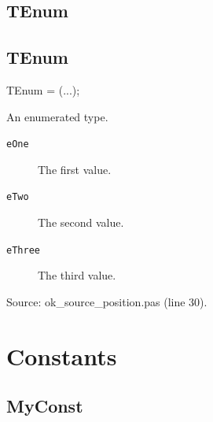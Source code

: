 \documentclass{report}
\newif\ifpdf
\begin{document}
\subsection*{\large{\textbf{TEnum}}\normalsize\hspace{1ex}\hrulefill}
\else
\subsection*{TEnum}
\fi
\label{ok_source_position-TEnum}
\begin{list}{}{
\setlength{\itemindent}{0cm}
\setlength{\listparindent}{0cm}
\setlength{\leftmargin}{\evensidemargin}
\addtolength{\leftmargin}{\tmplength}
\settowidth{\labelsep}{X}
\addtolength{\leftmargin}{\labelsep}
\setlength{\labelwidth}{\tmplength}
}
\item[\textbf{Declaration}\hfill]
\ifpdf
\begin{flushleft}
\fi
\begin{ttfamily}
TEnum = (...);\end{ttfamily}

\ifpdf
\end{flushleft}
\fi

\par
\item[\textbf{Description}]
An enumerated type.\item[\textbf{Values}]
\begin{description}
\item[\texttt{eOne}] \label{ok_source_position-eOne}
\index{}
The first value.
\item[\texttt{eTwo}] \label{ok_source_position-eTwo}
\index{}
The second value.
\item[\texttt{eThree}] \label{ok_source_position-eThree}
\index{}
The third value.
\end{description}
\par
Source: ok{\_}source{\_}position.pas (line 30).

\end{list}
\section{Constants}
\ifpdf
\subsection*{\large{\textbf{MyConst}}\normalsize\hspace{1ex}\hrulefill}
\else
\end{document}
